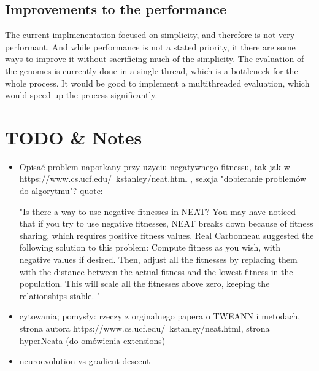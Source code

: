 \documentclass{article}
\begin{document}
        \subsection{Improvements to the performance}
        The current implmenentation focused on simplicity, and therefore is not very performant. And while performance
        is not a stated priority, it there are some ways to improve it without sacrificing much of the simplicity.
        The evaluation of the genomes is currently done in a single thread, which is a bottleneck for the whole process.
        It would be good to implement a multithreaded evaluation, which would speed up the process significantly.
\section{TODO \& Notes}
\begin{itemize}
    \item Opisać problem napotkany przy uzyciu negatywnego fitnessu, tak jak w https://www.cs.ucf.edu/~kstanley/neat.html , 
    sekcja "dobieranie problemów do algorytmu"?
    quote:

"Is there a way to use negative fitnesses in NEAT?
You may have noticed that if you try to use negative fitnesses, NEAT breaks down because of fitness sharing, which requires positive fitness values.
Real Carbonneau suggested the following solution to this problem: Compute fitness as you wish, with negative values if desired. Then, adjust all the fitnesses by replacing them with the distance between the actual fitness and the lowest fitness in the population. This will scale all the fitnesses above zero, keeping the relationships stable. "
\item cytowania; pomysły: rzeczy z orginalnego papera o TWEANN i metodach, strona autora https://www.cs.ucf.edu/~kstanley/neat.html, strona hyperNeata (do omówienia extensions)
\item neuroevolution vs gradient descent
\end{itemize}

\end{document}

